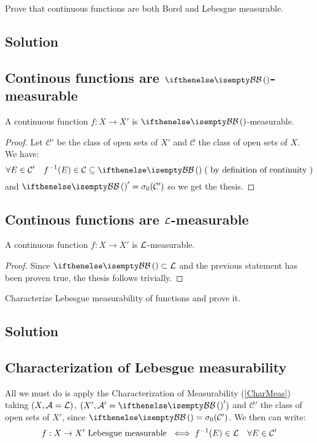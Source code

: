 
\question

Prove that continuous functions are both Borel and Lebesgue measurable.

\subsection*{Solution}

\subsection{Continous functions are \texorpdfstring{$\B$}{Borel}-measurable}
A continuous function $f:X\to X'$ is $\B$-measurable.

\begin{proof}
    Let $\mathcal{C}'$ be the class of open sets of $X'$ and $\mathcal{C}$ the class of open sets of $X$. We have:
    \[
        \forall E \in \mathcal{C}' \quad f^{-1}(E)\in\mathcal{C} \subseteq \B \; (\text{ by definition of continuity })
    \]
    and $\B'=\sigma_0(\mathcal{C}')$ so we get the thesis.
\end{proof}

\subsection{Continous functions are \texorpdfstring{$\mathcal{L}$}{Lebesgue}-measurable}
A continuous function $f:X\to X'$ is $\mathcal{L}$-measurable.

\begin{proof}
    Since $\B \subset \Leb$ and the previous statement has been proven true, the thesis follows trivially.
\end{proof}


\question

Characterize Lebesgue measurability of functions and prove it.

\subsection*{Solution}

\subsection{Characterization of Lebesgue measurability}
All we must do is apply the Characterization of Measurability (\ref{CharMeas}) taking $(X,\mathcal{A}=\mathcal{L})$, $(X', \A'=\B')$ and $\mathcal{C}'$ the class of open sets of $X'$, since $\B=\sigma_0(\mathcal{C}')$. We then can write:
\[
    f:X\to X' \text{ Lebesgue measurable } \iff f^{-1}(E)\in\mathcal{L} \quad \forall E\in\mathcal{C}'  
\]

